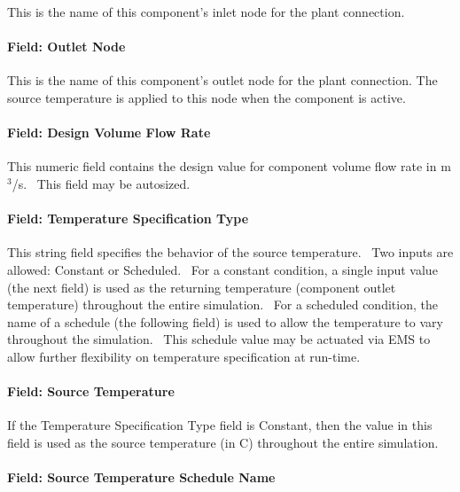 This is the name of this component's inlet node for the plant connection.

\paragraph{Field: Outlet Node}\label{field-outlet-node-000}

This is the name of this component's outlet node for the plant connection. The source temperature is applied to this node when the component is active.

\paragraph{Field: Design Volume Flow Rate}\label{field-design-volume-flow-rate}

This numeric field contains the design value for component volume flow rate in m\(^{3}\)/s.~ This field may be autosized.

\paragraph{Field: Temperature Specification Type}\label{field-temperature-specification-type}

This string field specifies the behavior of the source temperature.~ Two inputs are allowed: Constant or Scheduled.~ For a constant condition, a single input value (the next field) is used as the returning temperature (component outlet temperature) throughout the entire simulation.~ For a scheduled condition, the name of a schedule (the following field) is used to allow the temperature to vary throughout the simulation.~ This schedule value may be actuated via EMS to allow further flexibility on temperature specification at run-time.

\paragraph{Field: Source Temperature}\label{field-source-temperature}

If the Temperature Specification Type field is Constant, then the value in this field is used as the source temperature (in C) throughout the entire simulation.

\paragraph{Field: Source Temperature Schedule Name}\label{field-source-temperature-schedule-name}

